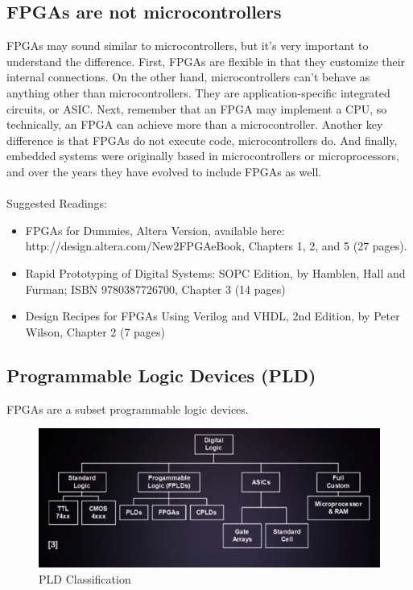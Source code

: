 \subsection{FPGAs are not microcontrollers}
FPGAs may sound similar to microcontrollers, but it's very important to understand the difference. First, FPGAs are flexible in that they customize their internal connections. On the other hand, microcontrollers can't behave as anything other than microcontrollers. They are application-specific integrated circuits, or ASIC. Next, remember that an FPGA may implement a CPU, so technically, an FPGA can achieve more than a microcontroller. Another key difference is that FPGAs do not execute code, microcontrollers do. And finally, embedded systems were originally based in microcontrollers or microprocessors, and over the years they have evolved to include FPGAs as well.\\\\
Suggested Readings:
\begin{itemize}
	\item FPGAs for Dummies, Altera Version, available here:  http://design.altera.com/New2FPGAeBook, Chapters 1, 2, and 5 (27 pages).
	\item Rapid Prototyping of Digital Systems: SOPC Edition, by Hamblen, Hall and Furman; ISBN 9780387726700, Chapter 3 (14 pages)
	\item Design Recipes for FPGAs Using Verilog and VHDL, 2nd Edition, by Peter Wilson, Chapter 2 (7 pages)
\end{itemize}


\subsection{Programmable Logic Devices (PLD)}
FPGAs are a subset programmable logic devices. 
\begin{figure}[H]
	\begin{center}
		\includegraphics[width=5in]{images/PLD.png}
		\caption{PLD Classification}
		\label{PLD}
	\end{center}
\end{figure}


